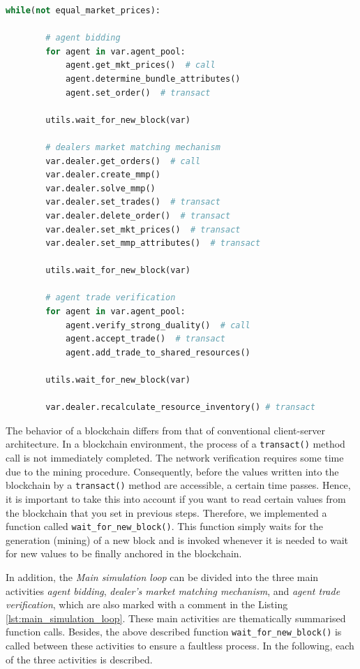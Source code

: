 \begin{lstlisting}[float=htbp, label=lst:main_simulation_loop, caption=Main loop of the simulation, language=Python]
    while(not equal_market_prices):
        
        # agent bidding
        for agent in var.agent_pool:
            agent.get_mkt_prices()  # call
            agent.determine_bundle_attributes()
            agent.set_order()  # transact

        utils.wait_for_new_block(var)

        # dealers market matching mechanism
        var.dealer.get_orders()  # call
        var.dealer.create_mmp()
        var.dealer.solve_mmp()
        var.dealer.set_trades()  # transact
        var.dealer.delete_order()  # transact
        var.dealer.set_mkt_prices()  # transact
        var.dealer.set_mmp_attributes()  # transact

        utils.wait_for_new_block(var)

        # agent trade verification
        for agent in var.agent_pool:
            agent.verify_strong_duality()  # call
            agent.accept_trade()  # transact
            agent.add_trade_to_shared_resources()

        utils.wait_for_new_block(var)

        var.dealer.recalculate_resource_inventory() # transact        
\end{lstlisting}

The behavior of a blockchain differs from that of conventional client-server architecture.
In a blockchain environment, the process of a \verb|transact()| method call is not immediately completed.
The network verification requires some time due to the mining procedure. 
Consequently, before the values written into the blockchain by a \verb|transact()| method are accessible, a certain time passes.
Hence, it is important to take this into account if you want to read certain values 
from the blockchain that you set in previous steps. 
Therefore, we implemented a function called \verb|wait_for_new_block()|. This function
simply waits for the generation (mining) of a new block and 
is invoked whenever it is needed to wait for new values to be finally anchored in the blockchain.

In addition, the \textit{Main simulation loop} can be divided into the three main activities 
\textit{agent bidding}, \textit{dealer's market matching mechanism}, and \textit{agent trade verification},
which are also marked with a comment in the Listing \ref{lst:main_simulation_loop}.
These main activities are thematically summarised function calls.
Besides, the above described function \verb|wait_for_new_block()| is called between these activities
to ensure a faultless process. 
In the following, each of the three activities is described.

